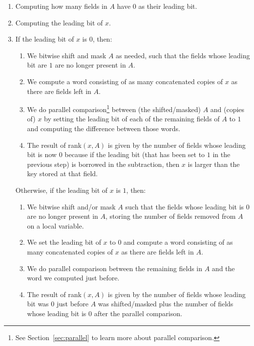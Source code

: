 \begin{enumerate}
    \item
    Computing how many fields in $A$ have $0$ as their leading bit.
    
    \item
    Computing the leading bit of $x$.
    
    \item
    If the leading bit of $x$ is $0$, then:
    \begin{enumerate}
        \item
        We bitwise shift and mask $A$ as needed, such that the fields whose leading bit are $1$ are no longer present in $A$.
        
        \item
        We compute a word consisting of as many concatenated copies of $x$ as there are fields left in $A$.
        
        \item
        We do parallel comparison\footnote{See Section~\ref{sec:parallel} to learn more about parallel comparison.} between (the shifted/masked) $A$ and (copies of) $x$ by setting the leading bit of each of the remaining fields of $A$ to $1$ and computing the difference between those words.
        
        \item
        The result of rank$(x,A)$ is given by the number of fields whose leading bit is now $0$ because if the leading bit (that has been set to $1$ in the previous step) is borrowed in the subtraction, then $x$ is larger than the key stored at that field.
    \end{enumerate}
    
    Otherwise, if the leading bit of $x$ is $1$, then:
    \begin{enumerate}
        \item
        We bitwise shift and/or mask $A$ such that the fields whose leading bit is $0$ are no longer present in $A$, storing the number of fields removed from $A$ on a local variable.
        
        \item
		We set the leading bit of $x$ to $0$ and compute a word consisting of as many concatenated copies of $x$ as there are fields left in $A$.
		
		\item
        We do parallel comparison between the remaining fields in $A$ and the word we computed just before.
        
        \item
        The result of rank$(x,A)$ is given by the number of fields whose leading bit was $0$ just before $A$ was shifted/masked plus the number of fields whose leading bit is $0$ after the parallel comparison.
    \end{enumerate}
    
\end{enumerate}

